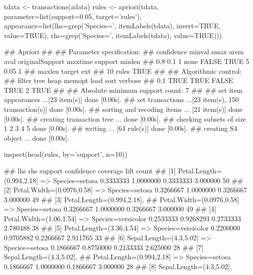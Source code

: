 \begin{Schunk}
\begin{Sinput}
tdata <- transactions(adata)
rules <- apriori(tdata, 
                 parameter=list(support=0.05,
                                target='rules'),
                 appearance=list(lhs=grep('Species=', itemLabels(tdata), invert=TRUE, value=TRUE),
                                 rhs=grep('Species=', itemLabels(tdata), value=TRUE)))
\end{Sinput}
\begin{Soutput}
## Apriori
## 
## Parameter specification:
##  confidence minval smax arem  aval originalSupport maxtime support minlen
##         0.8    0.1    1 none FALSE            TRUE       5    0.05      1
##  maxlen target  ext
##      10  rules TRUE
## 
## Algorithmic control:
##  filter tree heap memopt load sort verbose
##     0.1 TRUE TRUE  FALSE TRUE    2    TRUE
## 
## Absolute minimum support count: 7 
## 
## set item appearances ...[23 item(s)] done [0.00s].
## set transactions ...[23 item(s), 150 transaction(s)] done [0.00s].
## sorting and recoding items ... [21 item(s)] done [0.00s].
## creating transaction tree ... done [0.00s].
## checking subsets of size 1 2 3 4 5 done [0.00s].
## writing ... [64 rule(s)] done [0.00s].
## creating S4 object  ... done [0.00s].
\end{Soutput}
\begin{Sinput}
inspect(head(rules, by='support', n=10))
\end{Sinput}
\begin{Soutput}
##      lhs                            rhs                    support confidence  coverage     lift count
## [1]  {Petal.Length=(0.994,2.18]} => {Species=setosa}     0.3333333  1.0000000 0.3333333 3.000000    50
## [2]  {Petal.Width=(0.0976,0.58]} => {Species=setosa}     0.3266667  1.0000000 0.3266667 3.000000    49
## [3]  {Petal.Length=(0.994,2.18],                                                                      
##       Petal.Width=(0.0976,0.58]} => {Species=setosa}     0.3266667  1.0000000 0.3266667 3.000000    49
## [4]  {Petal.Width=(1.06,1.54]}   => {Species=versicolor} 0.2533333  0.9268293 0.2733333 2.780488    38
## [5]  {Petal.Length=(3.36,4.54]}  => {Species=versicolor} 0.2200000  0.9705882 0.2266667 2.911765    33
## [6]  {Sepal.Length=(4.3,5.02]}   => {Species=setosa}     0.1866667  0.8750000 0.2133333 2.625000    28
## [7]  {Sepal.Length=(4.3,5.02],                                                                        
##       Petal.Length=(0.994,2.18]} => {Species=setosa}     0.1866667  1.0000000 0.1866667 3.000000    28
## [8]  {Sepal.Length=(4.3,5.02],                                                                        
}
\end{Soutput}
\end{Schunk}
